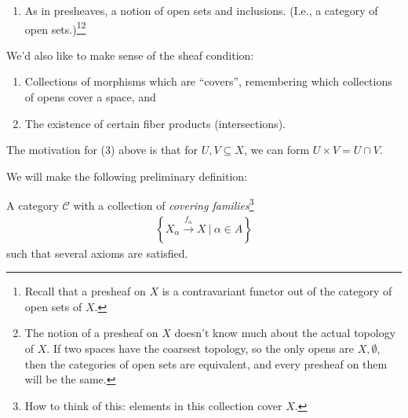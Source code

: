 \begin{answer}

\envlist

\begin{enumerate}
\def\labelenumi{\arabic{enumi}.}
\tightlist
\item
  As in presheaves, a notion of open sets and inclusions. (I.e., a
  category of open sets.)\footnote{Recall that a presheaf on \(X\) is a
    contravariant functor out of the category of open sets of \(X\).}\footnote{The
    notion of a presheaf on \(X\) doesn't know much about the actual
    topology of \(X\). If two spaces have the coarsest topology, so the
    only opens are \(X, \emptyset\), then the categories of open sets
    are equivalent, and every presheaf on them will be the same.}
\end{enumerate}

We'd also like to make sense of the sheaf condition:

\begin{enumerate}
\def\labelenumi{\arabic{enumi}.}
\setcounter{enumi}{1}
\item
  Collections of morphisms which are ``covers'', remembering which
  collections of opens cover a space, and
\item
  The existence of certain fiber products (intersections).
\end{enumerate}

\end{answer}

\begin{remark}

The motivation for (3) above is that for \(U, V \subseteq X\), we can
form \(U\times V = U\cap V\).

\end{remark}

We will make the following preliminary definition:

\begin{definition}\label{def:site}

A category \(\mathcal{C}\) with a collection of \emph{covering
families}\footnote{How to think of this: elements in this collection
  cover \(X\).}
\begin{align*}
\left\{{X_\alpha \xrightarrow{f_\alpha} X {~\mathrel{\Big|}~}\alpha\in A}\right\}
\end{align*}
such that several axioms are satisfied.

\end{definition}

